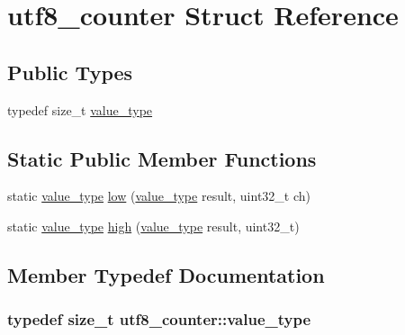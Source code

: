 \hypertarget{structutf8__counter}{
\section{utf8\_\-counter Struct Reference}
\label{structutf8__counter}
}
\subsection*{Public Types}
\begin{DoxyCompactItemize}
\item 
typedef size\_\-t \hyperlink{structutf8__counter_adb65152c007965c42184614da9c4af1b}{value\_\-type}
\end{DoxyCompactItemize}
\subsection*{Static Public Member Functions}
\begin{DoxyCompactItemize}
\item 
static \hyperlink{structutf8__counter_adb65152c007965c42184614da9c4af1b}{value\_\-type} \hyperlink{structutf8__counter_a0950643189089175ae0eac9b4193534d}{low} (\hyperlink{structutf8__counter_adb65152c007965c42184614da9c4af1b}{value\_\-type} result, uint32\_\-t ch)
\item 
static \hyperlink{structutf8__counter_adb65152c007965c42184614da9c4af1b}{value\_\-type} \hyperlink{structutf8__counter_ab16e675980a15e1ede2e4cd18d19f7b1}{high} (\hyperlink{structutf8__counter_adb65152c007965c42184614da9c4af1b}{value\_\-type} result, uint32\_\-t)
\end{DoxyCompactItemize}


\subsection{Member Typedef Documentation}
\hypertarget{structutf8__counter_adb65152c007965c42184614da9c4af1b}{
\subsubsection[{value\_\-type}]{\setlength{\rightskip}{0pt plus 5cm}typedef size\_\-t {\bf utf8\_\-counter::value\_\-type}}}
\label{structutf8__counter_adb65152c007965c42184614da9c4af1b}


